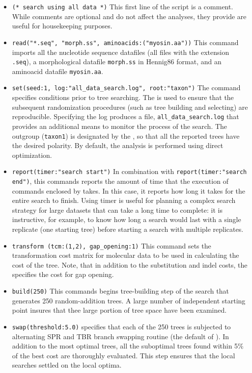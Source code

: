 \begin{itemize}
\item \texttt{(* search using all data *)} This first line of the script is a comment. While comments are optional and do not affect the analyses, they provide are useful for housekeeping purposes.
\item \texttt{read("*.seq", "morph.ss", aminoacids:("myosin.aa"))}
This command imports all the nucleotide sequence datafiles (all files with the extension \texttt{.seq}), a morphological datafile \texttt{morph.ss} in Hennig86 format, and an aminoacid datafile \texttt{myosin.aa}.
\item \texttt{set(seed:1, log:"all\_data\_search.log", root:"taxon")} The  command specifies conditions prior to tree searching. The  is used to ensure that the subsequent randomization procedures (such as tree building and selecting) are reproducible. Specifying the log produces a file, \texttt{all\_data\_search.log} that provides an additional means to monitor the process of the search. The outgroup (\texttt{taxon1}) is designated by the , so that all the reported trees have the desired polarity. By default, the analysis is performed using direct optimization.
\item \texttt{report(timer:"search start")} In combination with \texttt{report(timer:"search end")}, this commands reports the amount of time that the execution of commands enclosed by  takes. In this case, it reports how long it takes for the entire search to finish. Using timer is useful for planning a complex search strategy for large datasets that can take a long time to complete: it is instructive, for example, to know how long a search would last with a single replicate (one starting tree) before starting a search with multiple replicates.
\item \texttt{transform (tcm:(1,2), gap\_opening:1)} This command sets the transformation cost matrix for molecular data to be used in calculating the cost of the tree. Note, that in addition to the substitution and indel costs, the  specifies the cost for gap opening.
\item \texttt{build(250)} This commands begins tree-building step of the search that generates 250 random-addition trees. A large number of independent starting point insures that thee large portion of tree space have been examined.
\item \texttt{swap(threshold:5.0)}  specifies that each of the 250 trees is subjected to alternating SPR and TBR branch swapping routine (the default of \poy). In addition to the most optimal trees, all the suboptimal trees found within 5\% of the best cost are thoroughly evaluated. This step ensures that the local searches settled on the local optima.

\end{itemize}
